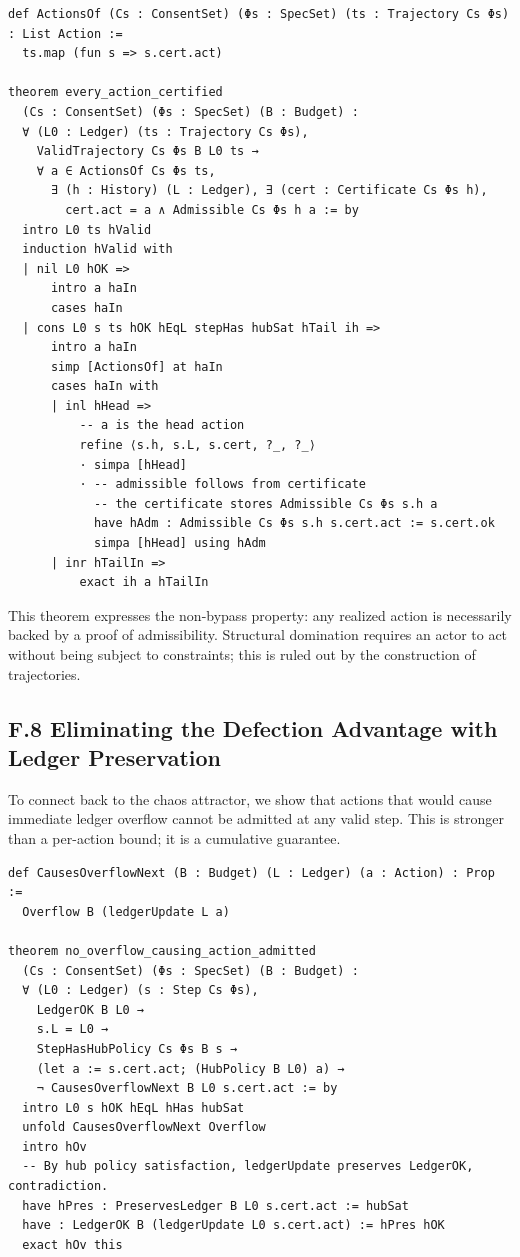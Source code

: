 \documentclass[11pt,oneside]{article}
\begin{document}
\begin{verbatim}
def ActionsOf (Cs : ConsentSet) (Φs : SpecSet) (ts : Trajectory Cs Φs) : List Action :=
  ts.map (fun s => s.cert.act)

theorem every_action_certified
  (Cs : ConsentSet) (Φs : SpecSet) (B : Budget) :
  ∀ (L0 : Ledger) (ts : Trajectory Cs Φs),
    ValidTrajectory Cs Φs B L0 ts →
    ∀ a ∈ ActionsOf Cs Φs ts,
      ∃ (h : History) (L : Ledger), ∃ (cert : Certificate Cs Φs h),
        cert.act = a ∧ Admissible Cs Φs h a := by
  intro L0 ts hValid
  induction hValid with
  | nil L0 hOK =>
      intro a haIn
      cases haIn
  | cons L0 s ts hOK hEqL stepHas hubSat hTail ih =>
      intro a haIn
      simp [ActionsOf] at haIn
      cases haIn with
      | inl hHead =>
          -- a is the head action
          refine ⟨s.h, s.L, s.cert, ?_, ?_⟩
          · simpa [hHead]
          · -- admissible follows from certificate
            -- the certificate stores Admissible Cs Φs s.h a
            have hAdm : Admissible Cs Φs s.h s.cert.act := s.cert.ok
            simpa [hHead] using hAdm
      | inr hTailIn =>
          exact ih a hTailIn
\end{verbatim}

This theorem expresses the non-bypass property: any realized action is necessarily backed by a proof of admissibility. Structural domination requires an actor to act without being subject to constraints; this is ruled out by the construction of trajectories.

\subsection{F.8 Eliminating the Defection Advantage with Ledger Preservation}

To connect back to the chaos attractor, we show that actions that would cause immediate ledger overflow cannot be admitted at any valid step. This is stronger than a per-action bound; it is a cumulative guarantee.

\begin{verbatim}
def CausesOverflowNext (B : Budget) (L : Ledger) (a : Action) : Prop :=
  Overflow B (ledgerUpdate L a)

theorem no_overflow_causing_action_admitted
  (Cs : ConsentSet) (Φs : SpecSet) (B : Budget) :
  ∀ (L0 : Ledger) (s : Step Cs Φs),
    LedgerOK B L0 →
    s.L = L0 →
    StepHasHubPolicy Cs Φs B s →
    (let a := s.cert.act; (HubPolicy B L0) a) →
    ¬ CausesOverflowNext B L0 s.cert.act := by
  intro L0 s hOK hEqL hHas hubSat
  unfold CausesOverflowNext Overflow
  intro hOv
  -- By hub policy satisfaction, ledgerUpdate preserves LedgerOK, contradiction.
  have hPres : PreservesLedger B L0 s.cert.act := hubSat
  have : LedgerOK B (ledgerUpdate L0 s.cert.act) := hPres hOK
  exact hOv this
\end{verbatim}
\end{document}
